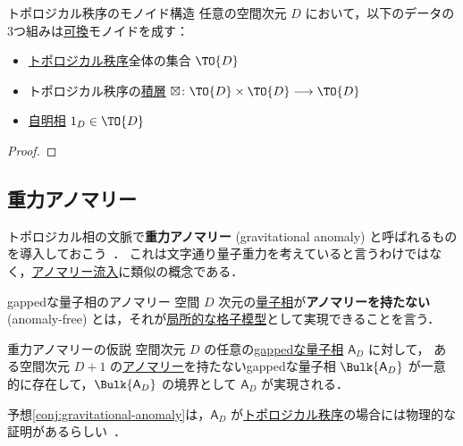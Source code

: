 \documentclass[TQFT_main]{subfiles}
\begin{document}
\begin{mypropph}[label=prop:monoidalTO]{トポロジカル秩序のモノイド構造}
    任意の空間次元 $D$ において，以下のデータの3つ組みは\underline{可換}モノイドを成す：
    \begin{itemize}
        \item \hyperref[def:quantum-phase]{トポロジカル秩序}全体の集合 $\TO{D}$
        \item トポロジカル秩序の\hyperref[def:stacking]{積層} $\boxtimes \colon \TO{D} \times \TO{D} \lto \TO{D}$
        \item \hyperref[def:trivialTO]{自明相} $1_D \in \TO{D}$
    \end{itemize}
\end{mypropph}

\begin{proof}
    
\end{proof}

\subsection{重力アノマリー}

トポロジカル相の文脈で\textbf{重力アノマリー} (gravitational anomaly) と呼ばれるものを導入しておこう~\cite{KongWen2014braidedfusioncategoriesgravitational}．
これは文字通り量子重力を考えていると言うわけではなく，\hyperref[hypo:anomaly-inflow]{アノマリー流入}に類似の概念である．

\begin{mydefph}[label=def:anomalousQP]{gappedな量子相のアノマリー}
    空間 $D$ 次元の\hyperref[def:quantum-phase]{量子相}が\textbf{アノマリーを持たない} (anomaly-free) とは，それが\hyperref[def:bosonic-lattice-model]{局所的な格子模型}として実現できることを言う．
\end{mydefph}

\begin{myconjph}[label=conj:gravitational-anomaly]{重力アノマリーの仮説}
    空間次元 $D$ の任意の\hyperref[def:quantum-phase]{gappedな量子相} $\mathsf{A}_D$ に対して，
    ある空間次元 $D+1$ の\hyperref[def:anomalousQP]{アノマリー}を持たないgappedな量子相 $\Bulk{\mathsf{A}_D}$ が一意的に存在して，$\Bulk{\mathsf{A}_D}$ の境界として $\mathsf{A}_D$ が実現される．
\end{myconjph}

予想\ref{conj:gravitational-anomaly}は，$\mathsf{A}_D$ が\hyperref[def:quantum-phase]{トポロジカル秩序}の場合には物理的な証明があるらしい~\cite[Lemma 2, p.19]{KongWen2014braidedfusioncategoriesgravitational}．
\end{document}
